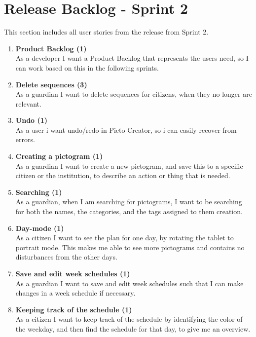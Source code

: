 \section{Release Backlog - Sprint 2}
This section includes all user stories from the release from Sprint 2.

\begin{enumerate}
	\setcounter{enumi}{0} %
	\item \textbf{Product Backlog (1)}\\
	As a developer I want a Product Backlog that represents the users need, so I can work based on this in the following sprints.
	
	\item \textbf{Delete sequences (3)}\\
	As a guardian I want to delete sequences for citizens, when they no longer are relevant.
	
	\item \textbf{Undo (1)}\\
	As a user i want undo/redo in Picto Creator, so i can easily recover from errors.
	
	\item \textbf{Creating a pictogram (1)}\\
	As a guardian I want to create a new pictogram, and save this to a specific citizen or the institution, to describe an action or thing that is needed.
	
	\item \textbf{Searching (1)}\\
	As a guardian, when I am searching for pictograms, I want to be searching for both the names, the categories, and the tags assigned to them creation.
	
	\item \textbf{Day-mode (1) }\\
	As a citizen I want to see the plan for one day, by rotating the tablet to portrait mode. This makes me able to see more pictograms and contains no disturbances from the other days.
	
	\item \textbf{Save and edit week schedules (1)}\\
	As a guardian I want to save and edit week schedules such that I can make changes in a week schedule if necessary.
	
	\item \textbf{Keeping track of the schedule (1)} \\
	As a citizen I want to keep track of the schedule by identifying the color of the weekday, and then find the schedule for that day, to give me an overview.
\end{enumerate}

